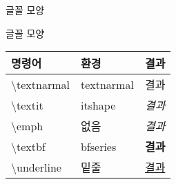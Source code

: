 \documentclass[10pt,xcolor=pdftex,dvipsnames,table,handout]{beamer}
\begin{document}
		\begin{frame}[plain]
		\end{frame}


		\begin{frame}[plain]
		\Huge{글꼴 모양}
		\end{frame}





		\begin{frame}[t,allowframebreaks]{글꼴 모양}

			\begin{table}
			\begin{tabular}{ l l l  }
				명령어	&환경	&결과\\
				\hline
				\textbackslash textnarmal 	&textnarmal 	&\textnormal{결과}\\
				\textbackslash textit 		&itshape		&\textit{결과}\\
				\textbackslash emph 		&없음		&\emph{결과}\\
				\textbackslash textbf 		&bfseries		&\textbf{결과}\\
				\textbackslash underline 	&밑줄		&\underline{결과}\\
			\end{tabular}
			\end{table}

		\end{frame}




\end{document}
